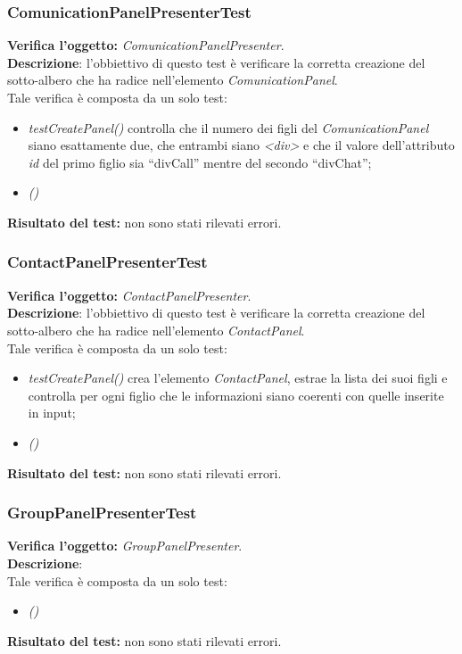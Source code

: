 \subsubsection{ComunicationPanelPresenterTest}
\textbf{Verifica l'oggetto:} \textit{ComunicationPanelPresenter}.\\
\textbf{Descrizione}: l'obbiettivo di questo test è verificare la corretta creazione del sotto-albero che ha radice nell'elemento \textit{ComunicationPanel}.\\
Tale verifica è composta da un solo test:
\begin{itemize}
\item \textit{testCreatePanel() } controlla che il numero dei figli del \textit{ComunicationPanel} siano esattamente due, che entrambi siano \textit{<div>} e che il valore dell'attributo \textit{id} del primo figlio sia ``divCall'' mentre del secondo ``divChat'';
\item \textit{()} %
\end{itemize}
\textbf{Risultato del test:} non sono stati rilevati errori.

\subsubsection{ContactPanelPresenterTest}
\textbf{Verifica l'oggetto:} \textit{ContactPanelPresenter}.\\
\textbf{Descrizione}: l'obbiettivo di questo test è verificare la corretta creazione del sotto-albero che ha radice nell'elemento \textit{ContactPanel}.\\
Tale verifica è composta da un solo test:
\begin{itemize}
\item \textit{testCreatePanel() }crea l'elemento \textit{ContactPanel}, estrae la lista dei suoi figli e controlla per ogni figlio che le informazioni siano coerenti con quelle inserite in input;
\item \textit{()} %
\end{itemize}
\textbf{Risultato del test:} non sono stati rilevati errori.

\subsubsection{GroupPanelPresenterTest}
\textbf{Verifica l'oggetto:} \textit{GroupPanelPresenter}.\\
\textbf{Descrizione}:\\
Tale verifica è composta da un solo test:
\begin{itemize}
\item \textit{() } %
\end{itemize}
\textbf{Risultato del test:} non sono stati rilevati errori.

